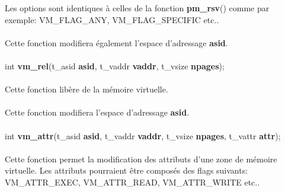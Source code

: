 \documentclass[10pt,a4wide]{article}
\begin{document}
Les options sont identiques \`a celles de la fonction \textbf{pm\_rsv}()
comme par exemple: VM\_FLAG\_ANY, VM\_FLAG\_SPECIFIC etc..

\paragraph{}

Cette fonction modifiera \'egalement l'espace d'adressage \textbf{asid}.

\paragraph{}

\hspace{1.5cm}int \textbf{vm\_rel}(t\_asid \textbf{asid},
                                   t\_vaddr \textbf{vaddr},
                                   t\_vsize \textbf{npages});

\paragraph{}

Cette fonction lib\`ere de la m\'emoire virtuelle.

\paragraph{}

Cette fonction modifiera l'espace d'adressage \textbf{asid}.

\paragraph{}

\hspace{1.5cm}int \textbf{vm\_attr}(t\_asid \textbf{asid},
                                    t\_vaddr \textbf{vaddr},
                                    t\_vsize \textbf{npages},
                                    t\_vattr \textbf{attr});

\paragraph{}

Cette fonction permet la modification des attributs d'une zone de
m\'emoire virtuelle. Les attributs pourraient \^etre compos\'es
des flags suivants: VM\_ATTR\_EXEC, VM\_ATTR\_READ, VM\_ATTR\_WRITE etc..

\paragraph{}
\end{document}
